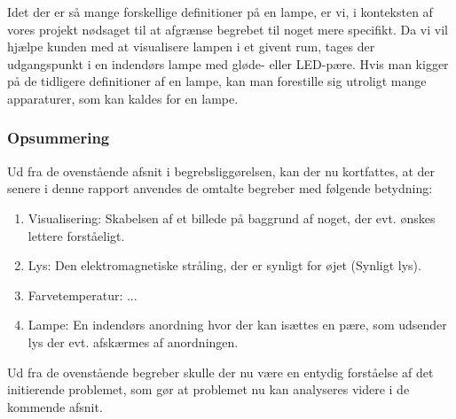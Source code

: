 Idet der er så mange forskellige definitioner på en lampe, er vi, i konteksten af vores projekt nødsaget til at afgrænse begrebet til noget mere specifikt. Da vi vil hjælpe kunden med at visualisere lampen i et givent rum, tages der udgangspunkt i en indendørs lampe med gløde- eller LED-pære. Hvis man kigger på de tidligere definitioner af en lampe, kan man forestille sig utroligt mange apparaturer, som kan kaldes for en lampe. 



\subsubsection*{Opsummering}
Ud fra de ovenstående afsnit i begrebsliggørelsen, kan der nu kortfattes, at der senere i denne rapport anvendes de omtalte begreber med følgende betydning:
\begin{enumerate}
  \item Visualisering: Skabelsen af et billede på baggrund af noget, der evt. ønskes lettere forståeligt.
  \item Lys: Den elektromagnetiske stråling, der er synligt for øjet (Synligt lys).
  \item Farvetemperatur: ...
  \item Lampe: En indendørs anordning hvor der kan isættes en pære, som udsender lys der evt. afskærmes af anordningen.
\end{enumerate}
Ud fra de ovenstående begreber skulle der nu være en entydig forståelse af det initierende problemet, som gør at problemet nu kan analyseres videre i de kommende afsnit.
